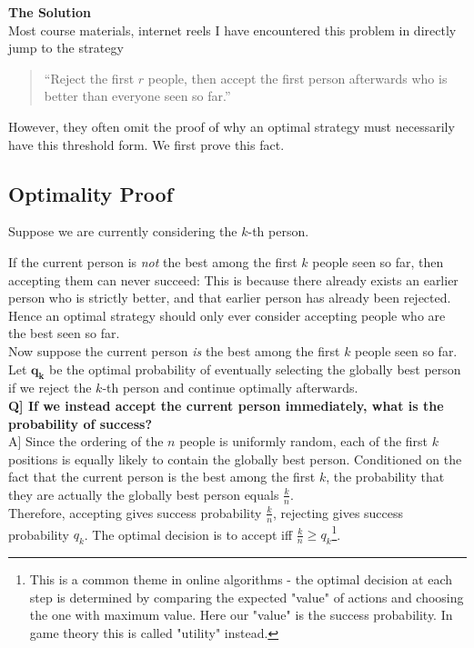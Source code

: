 \noindent\textbf{The Solution}\\

\noindent Most course materials, internet reels I have encountered this problem in 
directly jump to the strategy
\begin{quote}
``Reject the first \(r\) people, then accept the first person afterwards who is better than everyone seen so far.''
\end{quote}

\noindent However, they often omit the proof of why an optimal strategy must necessarily have this threshold form. We first prove this fact.

\subsection*{Optimality Proof}

Suppose we are currently considering the \(k\)-th person.

If the current person is \emph{not} the best among the first \(k\) people seen so far, then accepting them can never succeed:
This is because there already exists an earlier person who is strictly better, and that earlier person has already been rejected.
Hence an optimal strategy should only ever consider accepting people who are the best seen so far.\\


Now suppose the current person \emph{is} the best among the first \(k\) people seen so far. 
Let $\bm{q_k}$ be the optimal probability of eventually selecting the globally best person if we reject the $k$-th person and continue optimally afterwards.\\


\textbf{Q] If we instead accept the current person immediately, what is the probability of success?}\\


A] Since the ordering of the \(n\) people is uniformly random, each of the first \(k\) positions is equally likely to contain the globally best person. 
Conditioned on the fact that the current person is the best among the first \(k\), the probability that they are actually 
the globally best person equals $\frac{k}{n}$.\\

\vspace{0.4em}
\noindent Therefore, accepting gives success probability \(\frac{k}{n}\), rejecting gives success probability \(q_k\).
The optimal decision is to accept iff $\frac{k}{n} \ge q_k$\footnote{This is a 
common theme in online algorithms - the optimal decision at each step 
is determined by comparing the expected "value" of actions and choosing 
the one with maximum value. Here our "value" is the success probability. In 
game theory this is called "utility" instead.}. \\


